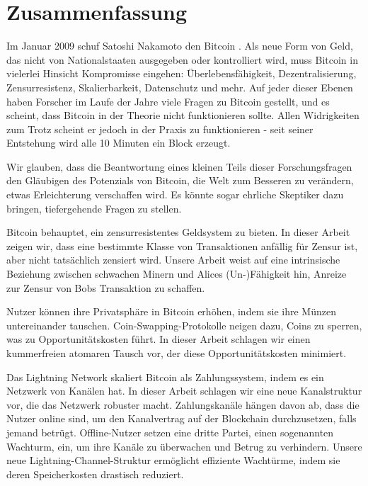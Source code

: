 \chapter*{Zusammenfassung}
Im Januar 2009 schuf Satoshi Nakamoto den Bitcoin \cite{bitcoin_whitepaper}. Als neue Form von Geld, das nicht von Nationalstaaten ausgegeben oder kontrolliert wird, muss Bitcoin in vielerlei Hinsicht Kompromisse eingehen: Überlebensfähigkeit, Dezentralisierung, Zensurresistenz, Skalierbarkeit, Datenschutz und mehr. Auf jeder dieser Ebenen haben Forscher im Laufe der Jahre viele Fragen zu Bitcoin gestellt, und es scheint, dass Bitcoin in der Theorie nicht funktionieren sollte. Allen Widrigkeiten zum Trotz scheint er jedoch in der Praxis zu funktionieren - seit seiner Entstehung wird alle 10 Minuten ein Block erzeugt.

Wir glauben, dass die Beantwortung eines kleinen Teils dieser Forschungsfragen den Gläubigen des Potenzials von Bitcoin, die Welt zum Besseren zu verändern, etwas Erleichterung verschaffen wird. Es könnte sogar ehrliche Skeptiker dazu bringen, tiefergehende Fragen zu stellen.

Bitcoin behauptet, ein zensurresistentes Geldsystem zu bieten. In dieser Arbeit zeigen wir, dass eine bestimmte Klasse von Transaktionen anfällig für Zensur ist, aber nicht tatsächlich zensiert wird. Unsere Arbeit weist auf eine intrinsische Beziehung zwischen schwachen Minern und Alices (Un-)Fähigkeit hin, Anreize zur Zensur von Bobs Transaktion zu schaffen.

Nutzer können ihre Privatsphäre in Bitcoin erhöhen, indem sie ihre Münzen untereinander tauschen. Coin-Swapping-Protokolle neigen dazu, Coins zu sperren, was zu Opportunitätskosten führt. In dieser Arbeit schlagen wir einen kummerfreien atomaren Tausch vor, der diese Opportunitätskosten minimiert. 

Das Lightning Network skaliert Bitcoin als Zahlungssystem, indem es ein Netzwerk von Kanälen hat. In dieser Arbeit schlagen wir eine neue Kanalstruktur vor, die das Netzwerk robuster macht. Zahlungskanäle hängen davon ab, dass die Nutzer online sind, um den Kanalvertrag auf der Blockchain durchzusetzen, falls jemand betrügt. Offline-Nutzer setzen eine dritte Partei, einen sogenannten Wachturm, ein, um ihre Kanäle zu überwachen und Betrug zu verhindern. Unsere neue Lightning-Channel-Struktur ermöglicht effiziente Wachtürme, indem sie deren Speicherkosten drastisch reduziert. 

